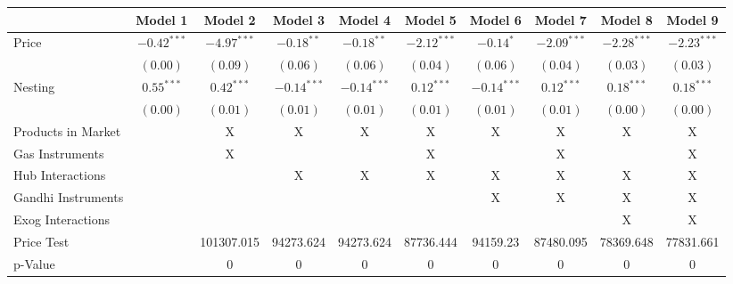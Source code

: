 \documentclass{article}
\begin{document}
\begin{appendices}
\begin{table}
{\begin{tabular}{l c c c c c c c c c}
\toprule
 & Model 1 & Model 2 & Model 3 & Model 4 & Model 5 & Model 6 & Model 7 & Model 8 & Model 9 \\
\midrule
Price                       & $-0.42^{***}$ & $-4.97^{***}$ & $-0.18^{**}$  & $-0.18^{**}$  & $-2.12^{***}$ & $-0.14^{*}$   & $-2.09^{***}$ & $-2.28^{***}$ & $-2.23^{***}$ \\
                            & $(0.00)$      & $(0.09)$      & $(0.06)$      & $(0.06)$      & $(0.04)$      & $(0.06)$      & $(0.04)$      & $(0.03)$      & $(0.03)$      \\
Nesting                     & $0.55^{***}$  & $0.42^{***}$  & $-0.14^{***}$ & $-0.14^{***}$ & $0.12^{***}$  & $-0.14^{***}$ & $0.12^{***}$  & $0.18^{***}$  & $0.18^{***}$  \\
                            & $(0.00)$      & $(0.01)$      & $(0.01)$      & $(0.01)$      & $(0.01)$      & $(0.01)$      & $(0.01)$      & $(0.00)$      & $(0.00)$      \\
\midrule
Products in Market          &               & X             & X             & X             & X             & X             & X             & X             & X             \\
Gas Instruments             &               & X             &               &               & X             &               & X             &               & X             \\
Hub Interactions            &               &               & X             & X             & X             & X             & X             & X             & X             \\
Gandhi Instruments          &               &               &               &               &               & X             & X             & X             & X             \\
Exog Interactions           &               &               &               &               &               &               &               & X             & X             \\
Price Test                  &               & 101307.015    & 94273.624     & 94273.624     & 87736.444     & 94159.23      & 87480.095     & 78369.648     & 77831.661     \\
p-Value                     &               & 0             & 0             & 0             & 0             & 0             & 0             & 0             & 0             \\

\end{tabular}}
\end{table}
\end{appendices}
\end{document}

